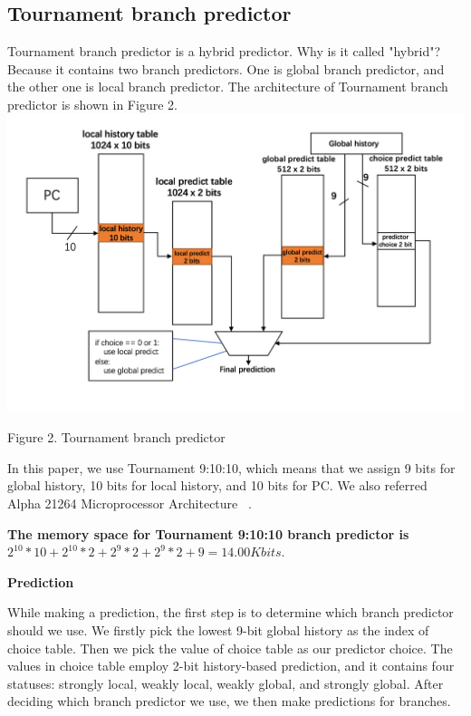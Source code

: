 \documentclass[conference]{IEEEtran}
\begin{document}
\subsection{Tournament branch predictor}
Tournament branch predictor is a hybrid predictor. Why is it called "hybrid"? Because it contains two branch predictors. One is global branch predictor, and the other one is local branch predictor. 
The architecture of Tournament branch predictor is shown in Figure 2. 
\includegraphics[width=\linewidth]{Tournament.png}
\begin{center}
  {\small Figure 2. Tournament branch predictor}
\end{center}

In this paper, we use Tournament 9:10:10, which means that we assign 9 bits for global history, 10 bits for local history, and 10 bits for PC. We also referred Alpha 21264 Microprocessor Architecture ~\cite{nicepaper5}.  

\textbf{The memory space for Tournament 9:10:10 branch predictor is $2^{10}*10+2^{10}*2+2^{9}*2+2^{9}*2+9 = 14.00K bits$}.

\begin{center}
  \textbf{Prediction}
\end{center}
While making a prediction, the first step is to determine which branch predictor should we use. We firstly pick the lowest 9-bit global history as the index of choice table. Then we pick the value of choice table as our predictor choice. 
The values in choice table employ 2-bit history-based prediction, and it contains four statuses: strongly local, weakly local, weakly global, and strongly global. After deciding which branch predictor we use, we then make predictions for branches. 
\end{document}
